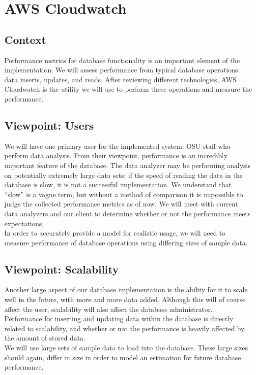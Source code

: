 \section{AWS Cloudwatch}
    \subsection{Context}
    Performance metrics for database functionality is an important element of the implementation. We will assess performance from typical database operations: data inserts, updates, and reads. After reviewing different technologies, AWS Cloudwatch is the utility we will use to perform these operations and measure the performance.
    
    \subsection{Viewpoint: Users}
    We will have one primary user for the implemented system: OSU staff who perform data analysis. From their viewpoint, performance is an incredibly important feature of the database. The data analyzer may be performing analysis on potentially extremely large data sets; if the speed of reading the data in the database is slow, it is not a successful implementation. We understand that “slow” is a vague term, but without a method of comparison it is impossible to judge the collected performance metrics as of now. We will meet with current data analyzers and our client to determine whether or not the performance meets expectations.\\
    
    \noindent In order to accurately provide a model for realistic usage, we will need to measure performance of database operations using differing sizes of sample data.
    
    \subsection{Viewpoint: Scalability}
    Another large aspect of our database implementation is the ability for it to scale well in the future, with more and more data added. Although this will of course affect the user, scalability will also affect the database administrator. Performance for inserting and updating data within the database is directly related to scalability, and whether or not the performance is heavily affected by the amount of stored data.\\
    
    \noindent We will use large sets of sample data to load into the database. These large sizes should again, differ in size in order to model an estimation for future database performance.
    
